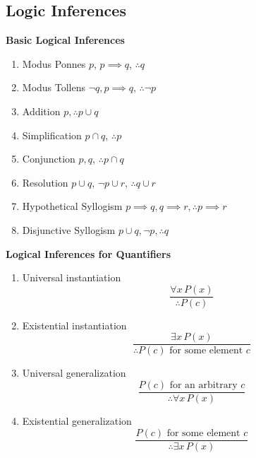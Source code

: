 \documentclass{article}
\begin{document}
\subsection{Logic Inferences}
\begin{definition}
    \textbf{Basic Logical Inferences}
    \begin{enumerate}
        \item Modus Ponnes \(p\), \(p \implies q\), \(\therefore q\)
        \item Modus Tollens \(\neg q, p \implies q\), \(\therefore \neg p\)
        \item Addition \(p, \therefore p \cup q\)
        \item Simplification \(p \cap q\), \(\therefore p\)
        \item Conjunction \(p,  q\), \(\therefore p \cap q\)
        \item Resolution \(p \cup q\), \(\neg p \cup r\), \(\therefore q \cup r\)
        \item Hypothetical Syllogism \(p \implies q, q \implies r, \therefore p \implies r\)
        \item Disjunctive Syllogism \(p \cup q, \neg p, \therefore q\)
    \end{enumerate}
\end{definition}
\begin{theorem}
    \textbf{Logical Inferences for Quantifiers}
    \begin{enumerate}
        \item Universal instantiation
            \[
            \frac{\forall x \, P(x)}{\therefore P(c)}
            \]
        \item Existential instantiation
        \[
        \frac{\exists x \, P(x)}{\therefore P(c) \text{ for some element } c}
        \]
        \item Universal generalization
        \[
        \frac{P(c) \text{ for an arbitrary } c}{\therefore \forall x \, P(x)}
        \]
        \item Existential generalization
            \[
            \frac{P(c) \text{ for some element } c}{\therefore \exists x \, P(x)}
            \]
    \end{enumerate}
\end{theorem}



\end{document}
